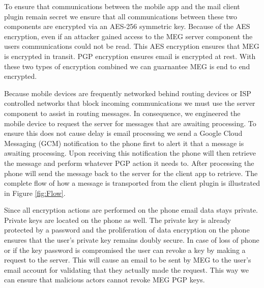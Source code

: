 \documentclass[11pt]{article}
\begin{document}
\par To ensure that communications between the mobile app and the mail client plugin remain secret we ensure that all communications between these two components are encrypted via an AES-256 symmetric key. Because of the AES encryption, even if an attacker gained access to the MEG server component the users communications could not be read. This AES encryption ensures that MEG is encrypted in transit. PGP encryption ensures email is encrypted at rest. With these two types of encryption combined we can guarnantee MEG is end to end encrypted.
\par Because mobile devices are frequently networked behind routing devices or ISP controlled networks that block incoming communications we must use the server component to assist in routing messages. In consequence, we engineered the mobile device to request the server for messages that are awaiting processing. To ensure this does not cause delay is email processing we send a Google Cloud Messaging (GCM) notification to the phone first to alert it that a message is awaiting processing. Upon receiving this notification the phone will then retrieve the message and perform whatever PGP action it needs to. After processing the phone will send the message back to the server for the client app to retrieve. The complete flow of how a message is transported from the client plugin is illustrated in Figure \ref{fig:Flow}.
\par Since all encryption actions are performed on the phone email data stays private. Private keys are located on the phone as well. The private key is already protected by a password and the proliferation of data encryption on the phone ensures that the user's private key remains doubly secure. In case of loss of phone or if the key password is compromised the user can revoke a key by making a request to the server. This will cause an email to be sent by MEG to the user's email account for validating that they actually made the request. This way we can ensure that malicious actors cannot revoke MEG PGP keys.
\end{document}

